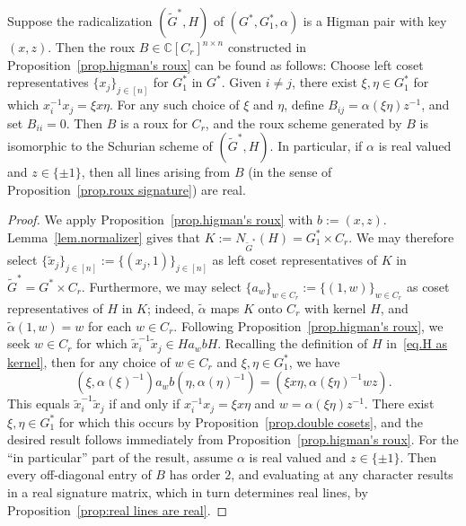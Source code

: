 \begin{lemma}
\label{lem.radicalization's roux}
Suppose the radicalization $(\tilde{G}^*,H)$ of $(G^*,G_1^*,\alpha)$ is a Higman pair with key $(x,z)$.
Then the roux $B\in\mathbb{C}[C_r]^{n\times n}$ constructed in Proposition~\ref{prop.higman's roux} can be found as follows:
Choose left coset representatives $\{x_j\}_{j\in[n]}$ for $G_1^*$ in $G^*$.
Given $i\neq j$, there exist $\xi,\eta\in G_1^*$ for which $x_i^{-1}x_j=\xi x\eta$.
For any such choice of $\xi$ and $\eta$, define $B_{ij}=\alpha(\xi\eta)z^{-1}$, and set $B_{ii}=0$.
Then $B$ is a roux for $C_r$, and the roux scheme generated by $B$ is isomorphic to the Schurian scheme of $(\tilde{G}^*,H)$.
In particular, if $\alpha$ is real valued and $z\in\{\pm1\}$, then all lines arising from $B$ (in the sense of Proposition~\ref{prop.roux signature}) are real.
\end{lemma}

\begin{proof}
We apply Proposition~\ref{prop.higman's roux} with $b:=(x,z)$.
Lemma~\ref{lem.normalizer} gives that $K:=N_{\tilde{G}^*}(H) = G_1^* \times C_r$.
We may therefore select $\{\tilde{x}_j \}_{j\in [n]} := 
\{ (x_j,1) \}_{j \in [n]}$ as left coset representatives of $K$ in $\tilde{G}^* = G^* \times C_r$.
Furthermore, we may select $\{ a_w \}_{w \in C_r} := \{ (1,w) \}_{w \in C_r}$ as coset representatives of $H$ in $K$; indeed, $\tilde{\alpha}$ maps $K$ onto $C_r$ with kernel $H$, and $\tilde{\alpha}(1,w) = w$ for each $w \in C_r$.
Following Proposition~\ref{prop.higman's roux}, we seek $w \in C_r$ for which $\tilde{x}_i^{-1} \tilde{x}_j \in H a_w b H$.
Recalling the definition of $H$ in~\eqref{eq.H as kernel}, then for any choice of $w \in C_r$ and $\xi,\eta \in G_1^*$, we have
\[
(\xi,\alpha(\xi)^{-1}) a_w b (\eta, \alpha(\eta)^{-1})
= (\xi x \eta, \alpha(\xi \eta)^{-1} w z).
\]
This equals $\tilde{x}_i^{-1} \tilde{x}_j$ if and only if $x_i^{-1} x_j = \xi x \eta$ and $w = \alpha(\xi \eta) z^{-1}$.
There exist $\xi,\eta \in G_1^*$ for which this occurs by Proposition~\ref{prop.double cosets}, and the desired result follows immediately from Proposition~\ref{prop.higman's roux}.
For the ``in particular'' part of the result, assume $\alpha$ is real valued and $z\in\{\pm1\}$.
Then every off-diagonal entry of $B$ has order $2$, and evaluating at any character results in a real signature matrix, which in turn determines real lines, by Proposition~\ref{prop:real lines are real}.
\end{proof}

